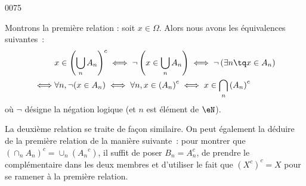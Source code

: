 
\begin{corrige}{0075}

Montrons la première relation : soit $x \in \Omega$. Alors nous avons les équivalences suivantes~:
\begin{equation*}
  \begin{split}
    & x \in {\left(\bigcup_nA_n\right)}^c \iff \neg \left( x \in
      \bigcup_nA_n \right) \iff \neg \left( \exists n \tq x \in
      A_n \right)\\
    \iff & \forall n, \neg (x \in A_n)\iff \forall n, x \in
    \left(A_n\right)^c \iff x \in \bigcap_n \left(A_n\right)^c
  \end{split}
\end{equation*}
où $\neg$ désigne la négation logique (et $n$ est élément de $\eN$).

La deuxième relation se traite de façon similaire. On peut également la déduire de la première relation de la manière suivante~: pour montrer que ${\left(\cap_n A_n\right)}^c = \cup_n ({A_n}^c)$, il suffit de poser $B_n = A_n^c$, de prendre le complémentaire dans les deux membres et d'utiliser le fait que ${(X^c)}^c = X$ pour se ramener à la première relation.


\end{corrige}
